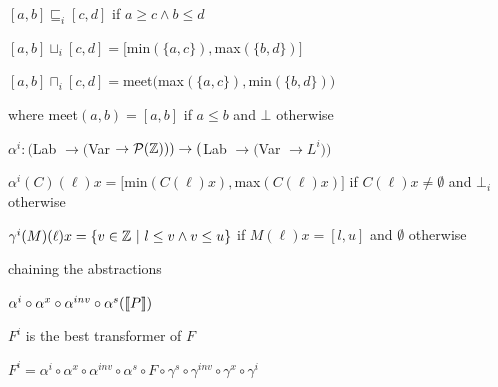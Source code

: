 			\enumend
			\item $[a,b] \sqsubseteq_i [c,d]$ if $a \ge c \land b \le d$
			\item $[a,b] \sqcup_i [c,d] = [$min$(\{a,c\}), $max$(\{b,d\})]$
			\item $[a,b] \sqcap_i [c,d] = $meet$($max$(\{a,c\}),$min$(\{b,d\}))$
			\item where meet$(a,b) = [a,b]$ if $a \le b$ and $\bot$ otherwise
			\item $\alpha^i: ($Lab $ \rightarrow ($Var $ \rightarrow \mathcal{P}(\mathbb{Z}))) \rightarrow ($Lab $\rightarrow ($Var $\rightarrow L^i))$
			\item $\alpha^i(C)(\ell)x = [$min$(C(\ell)x), $max$(C(\ell)x)]$ if $C(\ell)x \ne \emptyset$ and $\bot_i$ otherwise
			\item $\gamma^i(M)(\ell)x = \{v \in \mathbb{Z} \ | \ l \le v \land  v \le u\}$ if $M(\ell)x = [l, u]$ and $\emptyset$ otherwise
		\enumend
		\item chaining the abstractions
		\enumstart
			\item $\alpha^i \circ \alpha^x \circ \alpha^{inv} \circ \alpha^s(\llbracket P \rrbracket)$
			\item $F^i$ is the best transformer of $F$
			\item $F^i = \alpha^i \circ \alpha^x \circ \alpha^{inv} \circ \alpha^s \circ F \circ \gamma^s \circ \gamma^{inv} \circ \gamma^x \circ \gamma^i$
		\enumend
	\enumend
\enumend
